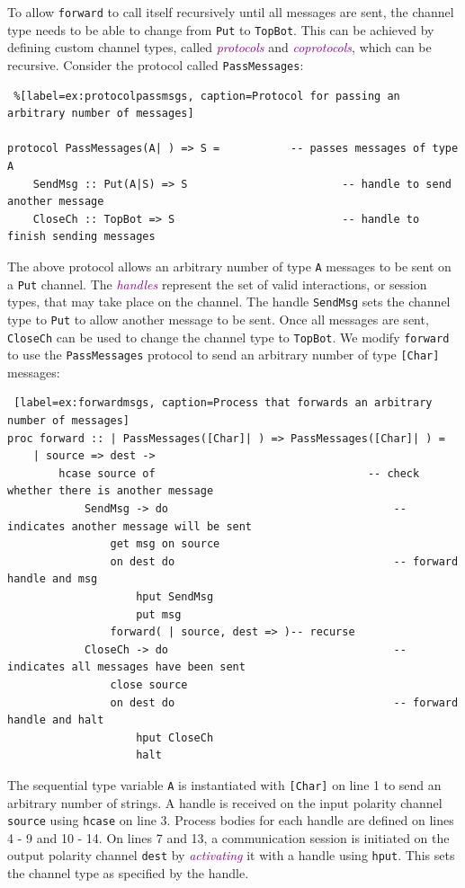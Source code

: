 \documentclass[11pt]{article}
\newcommand{\tc}[1]{\textcolor{darkMagenta}{\textit{#1}}}
\begin{document}
To allow \lstinline$forward$ to call itself recursively until all messages are sent, the channel type needs to be able to change from \lstinline$Put$ to \lstinline$TopBot$.
This can be achieved by defining custom channel types, called \tc{protocols} and \tc{coprotocols}, which can be recursive.
%
Consider the protocol called \lstinline$PassMessages$:

\newpage
\begin{lstlisting} %[label=ex:protocolpassmsgs, caption=Protocol for passing an arbitrary number of messages]

protocol PassMessages(A| ) => S =			-- passes messages of type A
    SendMsg :: Put(A|S) => S						-- handle to send another message
    CloseCh :: TopBot => S							-- handle to finish sending messages
\end{lstlisting}
The above protocol allows an arbitrary number of type \lstinline$A$ messages to be sent on a \lstinline$Put$ channel.
The \tc{handles} represent the set of valid interactions, or session types, that may take place on the channel. 
The handle \lstinline$SendMsg$ sets the channel type to \lstinline$Put$ to allow another message to be sent.
Once all messages are sent, \lstinline$CloseCh$ can be used to change the channel type to \lstinline$TopBot$.
We modify \lstinline$forward$ to use the \lstinline$PassMessages$ protocol to send an arbitrary number of type \lstinline$[Char]$ messages: 
\begin{lstlisting} [label=ex:forwardmsgs, caption=Process that forwards an arbitrary number of messages]
proc forward :: | PassMessages([Char]| ) => PassMessages([Char]| ) =
	| source => dest ->
		hcase source of									-- check whether there is another message
			SendMsg -> do									-- indicates another message will be sent
				get msg on source
				on dest do									-- forward handle and msg
					hput SendMsg		
					put msg
				forward( | source, dest => )-- recurse
			CloseCh -> do									-- indicates all messages have been sent
				close source
				on dest do									-- forward handle and halt
					hput CloseCh	
					halt
 \end{lstlisting}
The sequential type variable \lstinline$A$ is instantiated with \lstinline$[Char]$ on line 1 to send an arbitrary number of strings.
A handle is received on the input polarity channel \lstinline$source$ using \lstinline$hcase$ on line 3.
Process bodies for each handle are defined on lines 4 - 9 and 10 - 14.
On lines 7 and 13, a communication session is initiated on the output polarity channel \lstinline$dest$ by \tc{activating} it with a handle using \lstinline$hput$.
This sets the channel type as specified by the handle. 
\end{document}
